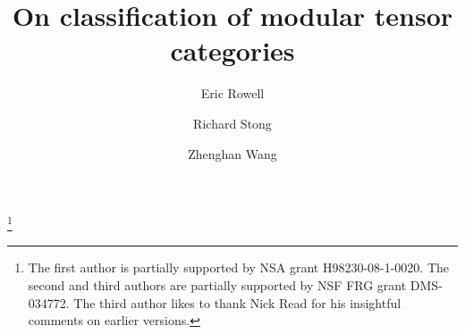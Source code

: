 \documentclass[12pt,psamsfonts]{amsart}
\numberwithin{equation}{section}
\theoremstyle{definition}
\begin{document}
\title[On classification of modular categories]
{On classification of modular tensor categories}

\author{Eric Rowell}
\address{Department of Mathematics\\
    Texas A\&M University \\
    College Station, TX 77843\\
    U.S.A.}

\author{Richard Stong}
\address{Center for Communications Research\\
    4320 Westerra Court\\
    San Diego, CA 92121-1969\\
    U.S.A.}

\author{Zhenghan Wang}
\address{Microsoft Station Q\\CNSI Bldg Rm 2237\\
    University of California\\
    Santa Barbara, CA 93106-6105\\
    U.S.A.}

\thanks{The first author is partially supported by NSA grant H98230-08-1-0020.
The second and third authors are partially supported by NSF FRG grant DMS-034772.  The third author likes to thank
Nick Read for his insightful comments on earlier versions.}
\end{document}
